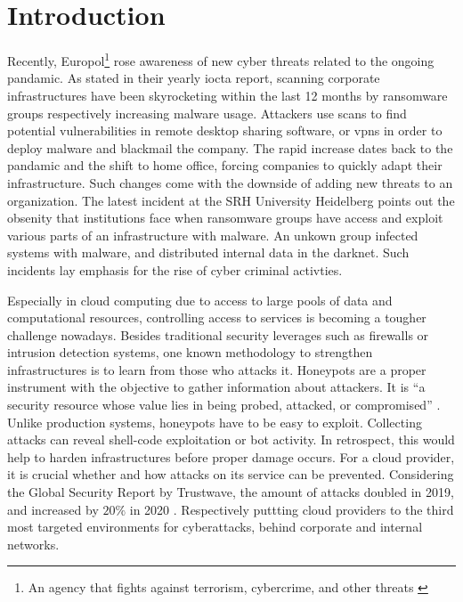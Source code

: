 \chapter{Introduction}

Recently, Europol\footnote{An agency that fights against terrorism, cybercrime, and other threats \cite{europol2021}} rose awareness of new cyber threats related to the ongoing pandamic.
As stated in their yearly \ac{iocta} report, scanning corporate infrastructures have been skyrocketing within the last 12 months by ransomware groups respectively increasing malware usage.
Attackers use scans to find potential vulnerabilities in remote desktop sharing software, or \acp{vpn} in order to deploy malware and blackmail the company. \cite{iocta2020}
The rapid increase dates back to the pandamic and the shift to home office, forcing companies to quickly adapt their infrastructure.
Such changes come with the downside of adding new threats to an organization.
The latest incident at the SRH University Heidelberg points out the obsenity that institutions face when ransomware groups have access and exploit various parts of an infrastructure with malware.
An unkown group infected systems with malware, and distributed internal data in the darknet.
Such incidents lay emphasis for the rise of cyber criminal activties.

Especially in cloud computing due to access to large pools of data and computational resources, controlling access to services is becoming a tougher challenge nowadays.
Besides traditional security leverages such as firewalls or intrusion detection systems, one known methodology to strengthen infrastructures is to learn from those who attacks it.
Honeypots are a proper instrument with the objective to gather information about attackers.
It is \enquote{a security resource whose value lies in being probed, attacked, or compromised} \cite{Spitzner2003}.
Unlike production systems, honeypots have to be easy to exploit. 
Collecting attacks can reveal shell-code exploitation or bot activity.
In retrospect, this would help to harden infrastructures before proper damage occurs.
For a cloud provider, it is crucial whether and how attacks on its service can be prevented.
Considering the Global Security Report by Trustwave, the amount of attacks doubled in 2019, and increased by $20\%$ in 2020 \cite{fahim2020}.
Respectively puttting cloud providers to the third most targeted environments for cyberattacks, behind corporate and internal networks.


